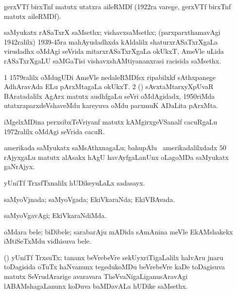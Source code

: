 {{\bentry 
{}
\gl{\nA}
\expl{}
\bmng
gerxVTf birxTnf matutx utatxra aileRMDf (1922ra varege, gerxVTf birxTnf matutx aileRMDf). 
\emng
\eentry

\bentry
{}
\gl{\nA}
\expl{}
\bmng
saMyukatx rASaTxrX saMsethx; vishavxsaMsethx; (parxparxthamavAgi 1942ralilx) 1939-45ra mahAyudadhxda kAldalilx shaturxrASaTxrXgaLa virudadhx oMdAgi seVrida mitarxrASaTxrXgaLa okUkxT, AmeVle uLida rASaTxrXgaLU saMGaTisi vishavxshAMtiyananxrasi racisida saMsethx. 
\emng
\eentry

\bentry
{}
\gl{\nA}
\expl{(\ca)}
\bmng
\bnum
\num{1} 1579ralilx oMdugUDi AmeVle nedaleRMDfsx ripabilxkf sAthxpanege AdhAravAda ELu pArxMtagaLa okUkxT. 
\num{2} (\ca) sAvxtaMtarxyXpUvaR BAratadalilx AgArx matutx audhfgaLu seVri oMdAgidadx, 1950riMda utatxraparxdeVshaveMdu kareyuva oMdu parxmuK ADaLita pArxMta. 
\enum
\emng
\eentry

\bentry
{}
\gl{\nA}
\expl{}
\bmng
iMgelxMDina perxsibxTeVriyanf matutx kAMgirxgeVSanalf cacuRgaLu 1972ralilx oMdAgi seVrida cacuR. 
\emng
\eentry

\bentry
{}
\gl{\nA}
\expl{}
\bmng
amerikada saMyukatx saMsAthxnagaLu; bahupAlu \kanu\ amerikadalilxdadx $50$ rAjyxgaLu matutx alAsakx hAgU havAyfgaLanUnx oLagoMDa saMyukatx gaNrAjyx. 
\emng
\eentry

\bentry
{} 
\gl{\nA}
\expl{}
\bmng
yUniTf TrxsfTxnalilx hUDikeyuLaLx sadasayx. 
\emng
\eentry

\bentry
{} 
\gl{\gu}
\bmng
saMyoVjnada; saMyoVgada; EkiVkaraNda; EkiVBAvada. 
\emng
\eentry

\bentry
{} 
\gl{\kirxvi}
\expl{}
\bmng
saMyoVgavAgi; EkiVkaraNdiMda. 
\emng
\eentry

\bentry
{}
\gl{\nA}
\expl{}
\bmng
oMdara bele; biDibele; sarabarAju mADida sAmAnina meVle EkAMshakekx iMtiSeTxMdu vidhisuva bele. 
\emng
\eentry

\bentry
{}
\gl{\nA}
\expl{}
\bmng
(\birx) yUniTf TrxsuTx; tananx beVrebeVre sekUyxriTigaLalilx halvAru jnaru toDagisida oTuTx haNvanunx tegedukoMDu beVrebeVre kaDe toDagisuva matutx SeVrudArarige avaravara TheVvaNigaLiganusAravAgi lABAMshagaLanunx koDuva baMDavALa hUDike saMsethx. 
\emng
\eentry

}}
